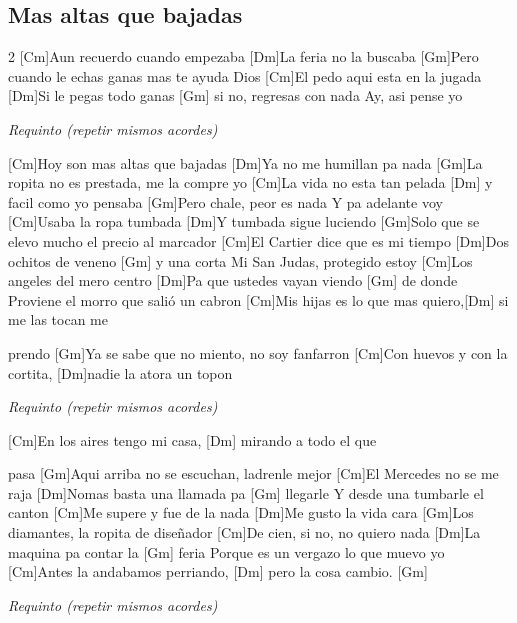 \subsection{Mas altas que bajadas}

\noindent
\vspace{1cm}

\begin{guitar}
	\begin{multicols}{2}
		[Cm]Aun recuerdo cuando empezaba
		[Dm]La feria no la buscaba
		[Gm]Pero cuando le echas ganas mas te ayuda Dios
		[Cm]El pedo aqui esta en la jugada
		[Dm]Si le pegas todo ganas [Gm] si no, regresas con nada 
		Ay, asi pense yo 

		\textit{Requinto (repetir mismos acordes)} 

		[Cm]Hoy son mas altas que bajadas
		[Dm]Ya no me humillan pa nada
		[Gm]La ropita no es prestada, me la compre yo
		[Cm]La vida no esta tan pelada [Dm] y facil como yo pensaba
		[Gm]Pero chale, peor es nada
		Y pa adelante voy
		[Cm]Usaba la ropa tumbada
		[Dm]Y tumbada sigue luciendo
		[Gm]Solo que se elevo mucho el precio al marcador
		[Cm]El Cartier dice que es mi tiempo
		[Dm]Dos ochitos de veneno [Gm] y una corta
		Mi San Judas, protegido estoy
		[Cm]Los angeles del mero centro
		[Dm]Pa que ustedes vayan viendo [Gm] de donde
		Proviene el morro que salió un cabron
		[Cm]Mis hijas es lo que mas quiero,[Dm] si me las tocan me \par prendo
		[Gm]Ya se sabe que no miento, no soy fanfarron
		[Cm]Con huevos y con la cortita, [Dm]nadie la atora un topon

		\textit{Requinto (repetir mismos acordes)} 

		[Cm]En los aires tengo mi casa, [Dm] mirando a todo el que \par pasa
		[Gm]Aqui arriba no se escuchan, ladrenle mejor
		[Cm]El Mercedes no se me raja
		[Dm]Nomas basta una llamada pa [Gm] llegarle
		Y desde una tumbarle el canton
		[Cm]Me supere y fue de la nada
		[Dm]Me gusto la vida cara
		[Gm]Los diamantes, la ropita de dise\~{n}ador
		[Cm]De cien, si no, no quiero nada
		[Dm]La maquina pa contar la [Gm] feria
		Porque es un vergazo lo que muevo yo
		[Cm]Antes la andabamos perriando, [Dm] pero la cosa cambio. [Gm]

		\textit{Requinto (repetir mismos acordes)} 

		
	\end{multicols}
\end{guitar}
